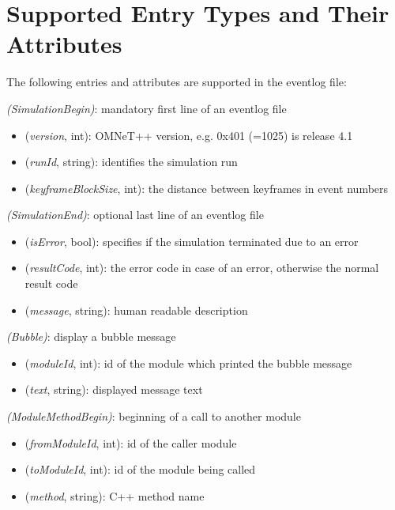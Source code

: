 \section{Supported Entry Types and Their Attributes}

The following entries and attributes are supported in the eventlog file:


 \textit{(SimulationBegin)}: mandatory first line of an eventlog file

\begin{itemize}
  \item {} (\textit{version}, int): OMNeT++ version, e.g. 0x401 (=1025) is release 4.1
  \item {} (\textit{runId}, string): identifies the simulation run
  \item {} (\textit{keyframeBlockSize}, int): the distance between keyframes in event numbers
\end{itemize}

 \textit{(SimulationEnd)}: optional last line of an eventlog file

\begin{itemize}
  \item {} (\textit{isError}, bool): specifies if the simulation terminated due to an error
  \item {} (\textit{resultCode}, int): the error code in case of an error, otherwise the normal result code
  \item {} (\textit{message}, string): human readable description
\end{itemize}

 \textit{(Bubble)}: display a bubble message

\begin{itemize}
  \item {} (\textit{moduleId}, int): id of the module which printed the bubble message
  \item {} (\textit{text}, string): displayed message text
\end{itemize}

 \textit{(ModuleMethodBegin)}: beginning of a call to another module

\begin{itemize}
  \item {} (\textit{fromModuleId}, int): id of the caller module
  \item {} (\textit{toModuleId}, int): id of the module being called
  \item {} (\textit{method}, string): C++ method name
\end{itemize}

